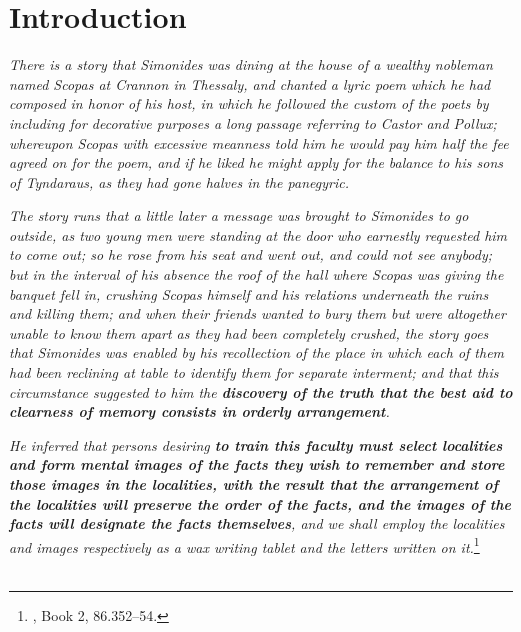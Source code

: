 \chapter{Introduction}
  \textit{ There is a story that Simonides was dining at the house of a wealthy
    nobleman named Scopas at Crannon in Thessaly, and chanted a lyric poem
    which he had composed in honor of his host, in which he followed the custom
    of the poets by including for decorative purposes a long passage referring
    to Castor and Pollux; whereupon Scopas with excessive meanness told him he
    would pay him half the fee agreed on for the poem, and if he liked he might
    apply for the balance to his sons of Tyndaraus, as they had gone halves in
  the panegyric.  }

  \textit{ The story runs that a little later a message was brought to
    Simonides to go outside, as two young men were standing at the door who
    earnestly requested him to come out; so he rose from his seat and went out,
    and could not see anybody; but in the interval of his absence the roof of
    the hall where Scopas was giving the banquet fell in, crushing Scopas
    himself and his relations underneath the ruins and killing them; and when
    their friends wanted to bury them but were altogether unable to know  them
    apart as they had been completely crushed, the story goes that Simonides
    was enabled by his  recollection of the place in which each of them had
    been reclining at table to identify them for separate interment; and that
    this circumstance suggested to him the \textbf{discovery of the truth that
    the best aid to clearness of memory consists in orderly arrangement}.  }

  \textit{ He inferred that persons desiring \textbf{to train this faculty must
    select localities and form mental images of the facts they wish to
    remember and store those images in the localities, with the result that
    the arrangement of the localities will preserve the order of the facts,
    and the images of the facts will designate the facts themselves}, and we
    shall employ the localities and images respectively as a wax writing tablet
  and the letters written on it.}\footnote{\cite{Cicero}, Book 2, 86.352--54.}\\\\

